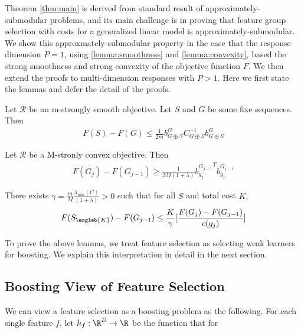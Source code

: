 Theorem \ref{thm:main} is derived from standard result of approximately-submodular problems, and
its main challenge is in proving that feature group selection with costs for a generalized linear model is 
approximately-submodular. We show this approxmately-submodular property in the case that the response 
dimension $P = 1$, using \ref{lemma:smoothness} and \ref{lemma:convexity}, based
the strong smoothness and strong convexity of the objective function $F$. We then extend the proofs to 
multi-dimension responses with $P > 1$. 
Here we first state the lemmas and 
defer the detail of the proofs. 

\begin{lemma}
  Let $\mathcal{R}$ be an m-strongly smooth objective. Let $S$ and $G$ be some fixe sequences. Then
  \begin{align}
    F(S) - F(G) \leq \frac{1}{2m} b^G_{G \oplus S} C_{G \oplus S}^{-1} b^G_{G\oplus S}
  \end{align}
  \label{lemma:smoothness}
\end{lemma}

\begin{lemma}
  Let $\mathcal{R}$ be a M-stronly convex objective. Then
    \begin{align}
      F(G_j) - F(G_{j-1}) \geq \frac{1}{2M (1 + \lambda) } {b^{G_{j-1}}_{g_j}}^Tb^{G_{j-1}}_{g_j}
    \end{align}
  \label{lemma:convexity}
\end{lemma}


\begin{lemma}
  There exists $\gamma = \frac{m}{M}\frac{\lambda_{\min}(C)}{(1 +\lambda)} > 0$ such that for all $S$ and total cost $K$,  
  \begin{align}
    F(S_{\angleb{K}}) - F(G_{j-1}) \leq \frac{K}{\gamma}
      \lbrack \frac{F(G_j) - F(G_{j-1})}{c(g_j)} \rbrack
  \end{align}
  \label{lemma:main}
\end{lemma}

To prove the above lemmas, we treat feature selection as selecting weak learners for boosting. We explain this 
interpretation in detail in the next section. 


\subsection{Boosting View of Feature Selection}
We can view a feature selection as a boosting problem as the following. 
For each single feature $f$, let $h_f : \R^D \rightarrow \R$ be the function that for 
